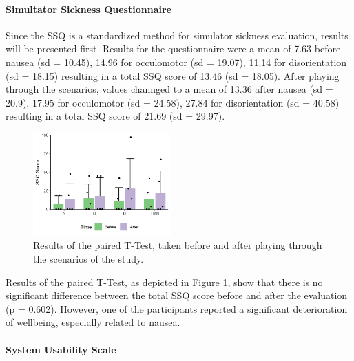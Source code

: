 \paragraph{Simultator Sickness Questionnaire}

Since the SSQ is a standardized method for simulator sickness evaluation, 
results will be presented first.
Results for the questionnaire were a mean of 7.63 before
nausea (sd = 10.45), 14.96 for occulomotor (sd = 19.07),
11.14 for disorientation (sd = 18.15)  resulting in 
a total SSQ score of 13.46 (sd = 18.05).
After playing through the scenarios, values channged to
a mean of 13.36 after
nausea (sd = 20.9), 17.95 for occulomotor (sd = 24.58),
27.84 for disorientation (sd = 40.58) resulting in 
a total SSQ score of 21.69 (sd = 29.97).

\begin{figure}[ht]
    \centering
    \includegraphics[width=200px]{images/evaluation/VR-SSQ.png}
    \caption{\label{fig::ssq}Results of the paired T-Test,
    taken before and after playing through the scenarios of the study.}
\end{figure}

Results of the paired T-Test, as depicted in Figure \ref{fig::ssq},
show that 
there is no significant difference between the total SSQ 
score before and after the evaluation (p = 0.602).
However, one of the participants reported a significant deterioration
of wellbeing, especially related to nausea.

\paragraph{System Usability Scale}

